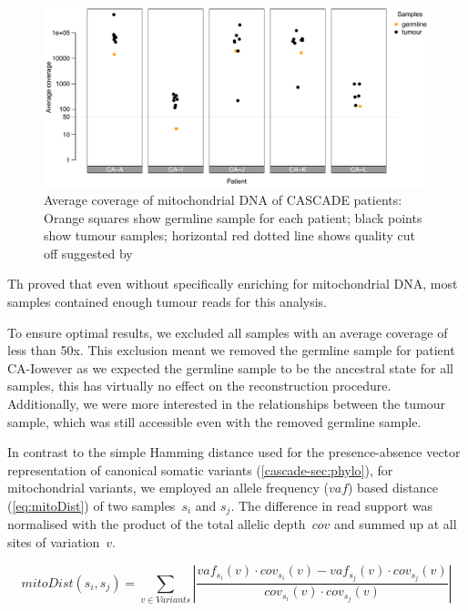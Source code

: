 \begin{figure}[hbt]
\centering
\includegraphics[width=.99\linewidth]{Figures/CASCADE/mito/mtCoverage}
\vspace{-1em}
\caption[Average coverage of mitochondrial DNA of CASCADE patients]{Average coverage of mitochondrial DNA of CASCADE patients: Orange squares show germline sample for each patient; black points show tumour samples; horizontal red dotted line shows quality cut off suggested by \protect\textcite{Ludwig2019}} \label{fig:mtCoverage}
\end{figure}


Th proved that even without specifically enriching for mitochondrial DNA, most samples contained enough tumour reads for this analysis.

To ensure optimal results, we excluded all samples with an average coverage of less than 50x. This exclusion meant we removed the germline sample for patient CA-Iowever as we expected the germline sample to be the ancestral state for all samples, this has virtually no effect on the reconstruction procedure. Additionally, we were more interested in the relationships between the tumour sample, which was still accessible even with the removed germline sample.

In contrast to the simple Hamming distance used for the presence-absence vector representation of canonical somatic variants (\autoref{cascade-sec:phylo}), for mitochondrial variants, we employed an allele frequency ($vaf$) based distance (\autoref{eq:mitoDist}) of two samples~$s_i$ and $s_j$. The difference in read support was normalised with the product of the total allelic depth~$cov$ and summed up at all sites of variation~$v$.

\begin{equation}
mitoDist(s_i,s_j) = \sum_{v \in Variants} \left| \frac{vaf_{s_i}(v) \cdot cov_{s_i}(v) - vaf_{s_j}(v) \cdot cov_{s_j}(v)}{cov_{s_i}(v) \cdot cov_{s_j}(v)} \right| \label{eq:mitoDist}
\end{equation}
\myequation[\ref{eq:mitoDist}]{Mitochondrial variants based distance function of two samples}

